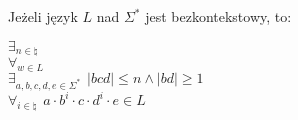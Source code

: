 \begin{theorem}
	Jeżeli język $L$ nad $\Sigma^*$ jest bezkontekstowy, to:

	\( \exists_{n \in \natural} \) \\
	\( \forall_{w \in L} \) \\
	\( \exists_{a, b, c, d, e \in \Sigma^*} \hspace{5pt} |bcd| \leq n \wedge |bd| \geq 1 \) \\
	\( \forall_{i \in \natural} \hspace{5pt} a \cdot b^{i} \cdot c \cdot d^{i} \cdot e \in L\)
\end{theorem}